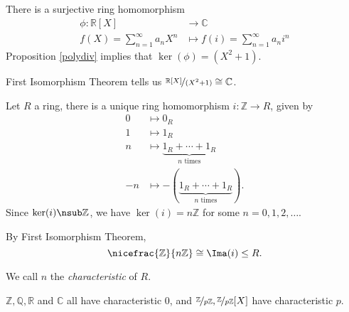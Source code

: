 \begin{example}
    There is a surjective ring homomorphism
    \[
    \begin{aligned}
      \phi
      \colon \mathbb{R}[X] & \longrightarrow   \mathbb{C} \\
      f(X) = \sum\limits_{n=1}^{\infty} a_n X^n & \longmapsto f(i) = \sum\limits_{n=1}^{\infty} a_n i^n
    \end{aligned}
    \]
    Proposition \eqref{polydiv} implies that \(\ker(\phi) = (X^2 + 1)\).

    First Isomorphism Theorem tells us \(\nicefrac{\mathbb{R}[X]}{(X^{2}+1)}\cong \mathbb{C}\).
\end{example}
\begin{example}
    Let \(R\) a ring, there is a unique ring homomorphism \(i: \mathbb{Z} \to R\), given by
    \begin{align*}
        0 &\longmapsto 0_R\\
        1 &\longmapsto 1_R\\
        n &\longmapsto \underbrace{1_R + \cdots + 1_R}_{n \text{ times}}\\
        -n &\longmapsto -(\underbrace{1_R + \cdots + 1_R}_{n \text{ times}}).
    \end{align*}
    Since \(\ker(i) \nsub \mathbb{Z}\), we have \(\ker(i) = n\mathbb{Z}\) for some \(n = 0,1,2, \ldots\).

    By First Isomorphism Theorem,
    \[
        \nicefrac{\mathbb{Z}}{n\mathbb{Z}}\cong \Ima(i) \leq R.
    \]
\end{example}
\begin{definition}
    We call \(n\)  the \textit{characteristic} of \(R\).
\end{definition}
\begin{example}
    \(\mathbb{Z},\mathbb{Q},\mathbb{R}\) and \(\mathbb{C}\) all have characteristic 0, and \(\nicefrac{\mathbb{Z}}{p\mathbb{Z}}, \nicefrac{\mathbb{Z}}{p\mathbb{Z}}[X]\) have characteristic \(p\).
\end{example}
